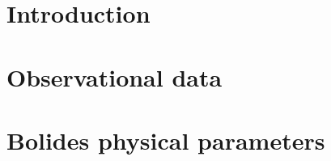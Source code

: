 \documentclass[times,twocolumn,final,authoryear]{elsarticle}
\begin{document}

\section{Introduction}
\label{sec1}








\section{Observational data}
\label{sec:methodology}


\section{Bolides physical parameters}
\label{sec:bolides}

\end{document}
